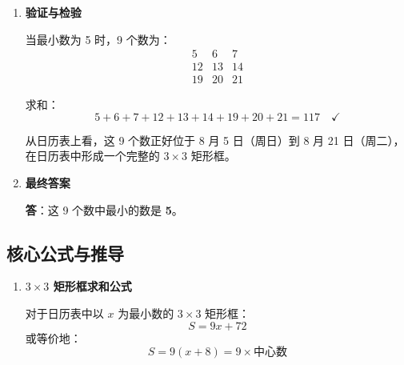 \documentclass[UTF8]{ctexart}
\newenvironment{redenv}{\color{red}}{}
\newenvironment{detailedanalysis}{%
    \color{red}
    \begin{enumerate}[label=\textbf{第\arabic*步：}, leftmargin=*, align=left, itemsep=1.5ex]
}{%
    \end{enumerate}
}
\newenvironment{formuladerivation}{%
    \begin{enumerate}[label={\textbf{公式\arabic*：}}, leftmargin=*, align=left]
}{%
    \end{enumerate}
}
\begin{document}
\begin{redenv}
\begin{detailedanalysis}
9 个数之和：
\begin{align*}
S &= x + (x+1) + (x+2) + (x+7) + (x+8) + (x+9) + (x+14) + (x+15) + (x+16) \\
&= 9x + (1+2+7+8+9+14+15+16) \\
&= 9x + 72
\end{align*}

根据题意：
\begin{align*}
9x + 72 &= 117 \\
9x &= 45 \\
x &= 5
\end{align*}

\textbf{更快捷的方法}——利用中心数性质：

在 $3 \times 3$ 矩形框中，\textbf{9 个数的和 = 中心数 $\times$ 9}。

\begin{itemize}
    \item 9 个数之和为 117
    \item 中心数为 $117 \div 9 = 13$
    \item 最小数比中心数小 8，所以最小数为 $13 - 8 = 5$
\end{itemize}

\item \textbf{验证与检验}

当最小数为 5 时，9 个数为：
\[
\begin{array}{ccc}
5 & 6 & 7 \\
12 & 13 & 14 \\
19 & 20 & 21
\end{array}
\]

求和：
\[
5+6+7+12+13+14+19+20+21 = 117 \quad \checkmark
\]

从日历表上看，这 9 个数正好位于 8 月 5 日（周日）到 8 月 21 日（周二），在日历表中形成一个完整的 $3 \times 3$ 矩形框。

\item \textbf{最终答案}

\textbf{答}：这 9 个数中最小的数是 \textbf{5}。
\end{detailedanalysis}

\subsection*{核心公式与推导}

\begin{formuladerivation}
\item \textbf{$3 \times 3$ 矩形框求和公式}

对于日历表中以 $x$ 为最小数的 $3 \times 3$ 矩形框：
\[
S = 9x + 72
\]
或等价地：
\[
S = 9(x + 8) = 9 \times \text{中心数}
\]


\end{formuladerivation}
\end{redenv}
\end{document}
